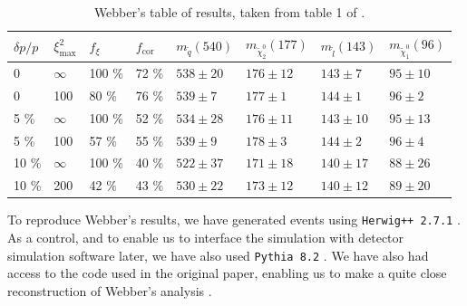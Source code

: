 \documentclass[twoside,english]{uiofysmaster}
\begin{document}
\begin{table}[hbt]
	\centering
	\begin{tabular}{| l | l | l | l  || l | l | l | l |}
		\hline
		$\delta p/p$ & $\xi^2_\mathrm{max}$ & $f_\xi$ & $f_\mathrm{cor}$ & $m_{\tilde q} (540)$ & $m_{\tilde \chi_2^0} (177)$ & $m_{\tilde l} (143)$ & $m_{\tilde \chi_1^0} (96)$ \\
		\hline \hline
		0 & 	$\infty$ &	100 \%	& 72 \%	& $538 \pm 20$	&	$176 \pm 12$	&	$143 \pm 7$	& 	$95 \pm 10$	\\
		0 &		100 &		80 \%	& 76 \% & $539 \pm 7$	&	$177 \pm 1$		&	$144 \pm 1$	&	$96 \pm 2$	\\
		5 \% &	$\infty$ &	100 \%	& 52 \% & $534 \pm 28$	& 	$176 \pm 11$	&	$143 \pm 10$&	$95 \pm 13$ \\
		5 \% &	100 &		57 \%	& 55 \% & $539 \pm 9$	&	$178 \pm 3$		& 	$144 \pm 2$	&	$96 \pm 4$	\\
		10 \% &	$\infty$ &	100 \%	& 40 \% & $522 \pm 37$	&	$171 \pm 18$	&	$140 \pm 17$&	$88 \pm 26$	\\
		10 \% &	200 &		42 \%	& 43 \% & $530 \pm 22$	& 	$173 \pm 12$	&	$140 \pm 12$&	$89 \pm 20$ \\
		\hline
	\end{tabular}
	\caption{Webber's table of results, taken from table 1 of \cite{Webber:2009vm}.}
	\label{table:webber_original}
\end{table}




To reproduce Webber's results, we have generated events using {\tt Herwig++ 2.7.1} \cite{Bahr:2008pv}. As a control, and to enable us to interface the simulation with detector simulation software later, we have also used {\tt Pythia 8.2} \cite{Sjostrand:2014zea}. We have also had access to the code used in the original paper, enabling us to make a quite close reconstruction of Webber's analysis \cite{Webber:epost}. 
\end{document}
